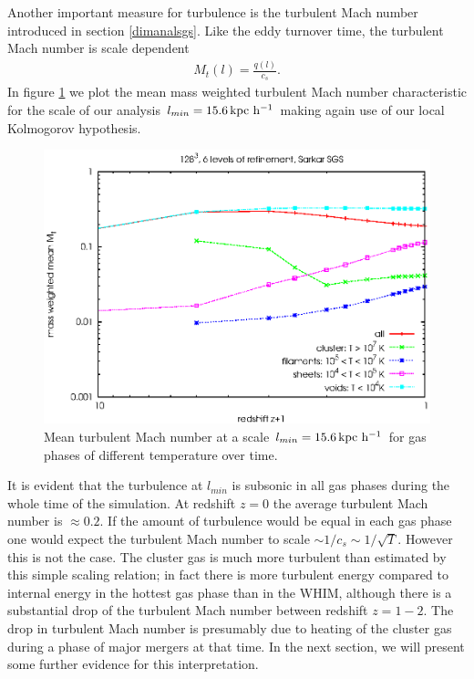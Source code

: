 Another important measure for turbulence is the turbulent Mach number
introduced in section \ref{dimanalsgs}. Like the eddy turnover time, the
turbulent Mach number is scale dependent
\begin{align}
M_t(l)=\frac{q(l)}{c_s}.
\end{align}
In figure \ref{fig:machturb} we plot the mean mass weighted turbulent Mach
number characteristic for the scale of our analysis 
$l_{min}=\unit[15.6]{kpc\ h^{-1}}$ making again use of our local Kolmogorov
hypothesis.
\begin{figure}[tp]
\centering
\includegraphics[width=0.7\linewidth]{chapter9/machturb_red_sar.eps}
\caption{Mean turbulent Mach number at a scale 
$l_{min}=\unit[15.6]{kpc\ h^{-1}}$ for gas phases of different temperature over
time.}
\label{fig:machturb}
\end{figure}
It is evident that the turbulence at $l_{min}$ is subsonic in all gas phases
during the whole time of the simulation. At redshift $z=0$ the average
turbulent Mach number is $\approx 0.2$. If the
amount of turbulence would be equal in each gas phase one would expect the
turbulent Mach number to scale $\sim 1/c_s \sim 1/\sqrt{T}$. However this is
not the case. The cluster gas is much more turbulent than estimated by this
simple scaling relation; in fact there is more turbulent energy compared to 
internal energy in the hottest gas phase than in the WHIM, although there is a
substantial drop of the turbulent Mach number between redshift $z=1-2$. The
drop in turbulent Mach number is presumably due to heating of the cluster gas
during a phase of major mergers at that time. In the next section, we will 
present some further evidence for this interpretation.  

